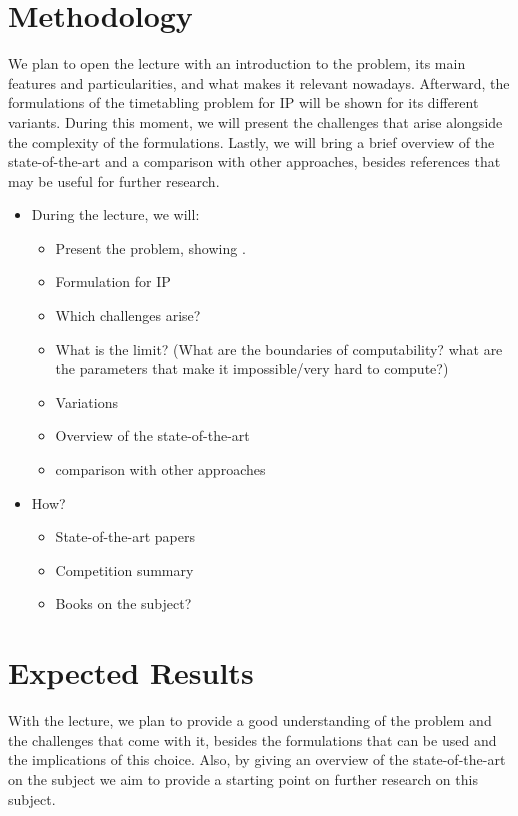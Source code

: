 \documentclass[a4paper]{report}
\begin{document}
\section*{Methodology}

We plan to open the lecture with an introduction to the problem, its main features and particularities, and what makes it relevant nowadays. Afterward, the formulations of the timetabling problem for IP will be shown for its different variants. During this moment, we will present the challenges that arise alongside the complexity of the formulations. Lastly, we will bring a brief overview of the state-of-the-art and a comparison with other approaches, besides references that may be useful for further research.

\begin{itemize}
    \item During the lecture, we will:
	\begin{itemize}
	    \item Present the problem, showing .
	    \item Formulation for IP
	    \item Which challenges arise?
	    \item What is the limit? (What are the boundaries of computability? what are the parameters that make it impossible/very hard to compute?)
	    \item Variations
	    \item Overview of the state-of-the-art
	    \item comparison with other approaches
	\end{itemize}
    \item How?
	\begin{itemize}
	    \item State-of-the-art papers
	    \item Competition summary
	    \item Books on the subject?
	\end{itemize}
\end{itemize}

\section*{Expected Results}

With the lecture, we plan to provide a good understanding of the problem and the challenges that come with it, besides the formulations that can be used and the implications of this choice. Also, by giving an overview of the state-of-the-art on the subject we aim to provide a starting point on further research on this subject.
\end{document}

